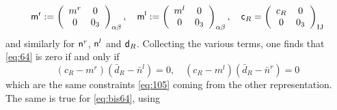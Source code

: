 \documentclass[11pt]{article}
\newcommand{\sI}{\mathrm  I}
\newcommand{\sJ}{\mathrm J}
\begin{document}
\begin{equation}
{\sf m^{r}}:=\left(\begin{array}{cc}
m^{r} & 0\\
0 & 0_{3}
\end{array}\right)_{\alpha\beta},\quad
{\sf m^{l}}:=\left(\begin{array}{cc}
m^{l} & 0\\
0 & 0_{3}
\end{array}\right)_{\alpha\beta},
\quad
{\sf c}_{R}=\left(\begin{array}{cc}
c_{R} & 0\\
0 & 0_{3}
\end{array}\right)_{\sI\sJ}
\label{eq:104bis}
\end{equation}
and similarly for ${\sf n}^r$, ${\sf n}^l$ and ${\sf d}_R$. Collecting the various terms,
one finds that \eqref{eq:64} is zero if and only if 
\begin{equation}
(c_R-m^r)(\bar{d}_R-\bar{n}^l)=0,\quad(c_R-m^l)(\bar{d}_R-\bar{n}^r)=0
\label{eq:105-bis}
\end{equation}
which are the same constraints \eqref{eq:105} coming from the other representation.
The same is true for \eqref{eq:bis64}, using
\end{document}

